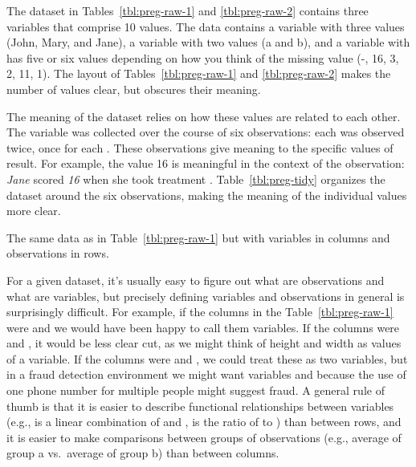 \documentclass[article]{jss}
\begin{document}
The dataset in Tables~\ref{tbl:preg-raw-1} and \ref{tbl:preg-raw-2} contains three variables that comprise 10 values. The data contains a  variable with three values (John, Mary, and Jane), a  variable with two values (a and b), and a  variable with has five or six values depending on how you think of the missing value (-, 16, 3, 2, 11, 1). The layout of Tables~\ref{tbl:preg-raw-1} and \ref{tbl:preg-raw-2} makes the number of values clear, but obscures their meaning.

The meaning of the dataset relies on how these values are related to each other. The  variable was collected over the course of six observations: each  was observed twice, once for each . These observations give meaning to the specific values of result. For example, the value 16 is meaningful in the context of the observation: \emph{Jane} scored \emph{16} when she took treatment . Table~\ref{tbl:preg-tidy} organizes the dataset around the six observations, making the meaning of the individual values more clear. 

\begin{table}[htbp]
  \centering
  
  \caption{The same data as in Table~\ref{tbl:preg-raw-1} but with variables in columns and observations in rows.}
  \label{tbl:preg-tidy}
\end{table}

For a given dataset, it's usually easy to figure out what are observations and what are variables, but precisely defining variables and observations in general is surprisingly difficult. For example, if the columns in the Table~\ref{tbl:preg-raw-1} were  and  we would have been happy to call them variables. If the columns were 
 and , it would be less clear cut, as we might think of height and width as values of a  variable. If the columns were  and , we could treat these as two variables, but in a fraud detection environment we might want variables  and  because the use of one phone number for multiple people might suggest fraud. A general rule of thumb is that it is easier to describe functional relationships between variables (e.g.,  is a linear combination of  and ,  is the ratio of  to ) than between rows, and it is easier to make comparisons between groups of observations (e.g., average of group a vs.\ average of group b) than between columns.
\end{document}
